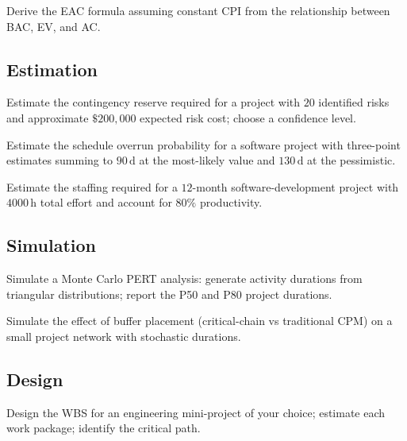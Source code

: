 \begin{exercise}
Derive the EAC formula assuming constant CPI from the relationship between BAC, EV, and AC.
\end{exercise}

\subsection*{Estimation}

\begin{exercise}
Estimate the contingency reserve required for a project with $20$ identified risks and approximate $\$200{,}000$ expected risk cost; choose a confidence level.
\end{exercise}

\begin{exercise}
Estimate the schedule overrun probability for a software project with three-point estimates summing to $90\,\text{d}$ at the most-likely value and $130\,\text{d}$ at the pessimistic.
\end{exercise}

\begin{exercise}
Estimate the staffing required for a $12$-month software-development project with $4000\,\text{h}$ total effort and account for $80\%$ productivity.
\end{exercise}

\subsection*{Simulation}

\begin{exercise}
Simulate a Monte Carlo PERT analysis: generate activity durations from triangular distributions; report the P50 and P80 project durations.
\end{exercise}

\begin{exercise}
Simulate the effect of buffer placement (critical-chain vs traditional CPM) on a small project network with stochastic durations.
\end{exercise}

\subsection*{Design}

\begin{exercise}
Design the WBS for an engineering mini-project of your choice; estimate each work package; identify the critical path.
\end{exercise}

